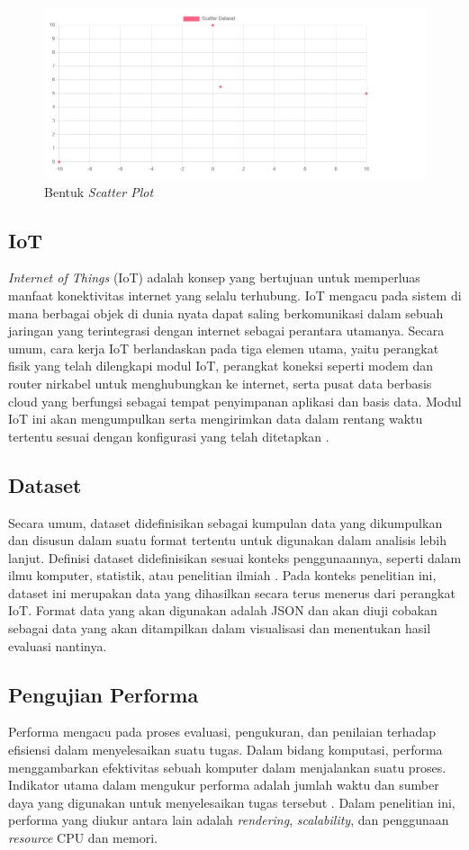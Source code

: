 \begin{figure}[H]
	\centering
	\includegraphics[width=0.8\linewidth]{gambar/Dasar teori/scatter.png}
	\caption{Bentuk \textit{Scatter Plot}}
	\label{gambar1}
\end{figure}

\subsection{IoT}
\textit{Internet of Things} (IoT) adalah konsep yang bertujuan untuk memperluas manfaat konektivitas internet yang selalu terhubung. IoT mengacu pada sistem di mana berbagai objek di dunia nyata dapat saling berkomunikasi dalam sebuah jaringan yang terintegrasi dengan internet sebagai perantara utamanya. Secara umum, cara kerja IoT berlandaskan pada tiga elemen utama, yaitu perangkat fisik yang telah dilengkapi modul IoT, perangkat koneksi seperti modem dan router nirkabel untuk menghubungkan ke internet, serta pusat data berbasis cloud yang berfungsi sebagai tempat penyimpanan aplikasi dan basis data. Modul IoT ini akan mengumpulkan serta mengirimkan data dalam rentang waktu tertentu sesuai dengan konfigurasi yang telah ditetapkan \cite{Mykhailo2024}.

\subsection{Dataset}
Secara umum, dataset didefinisikan sebagai kumpulan data yang dikumpulkan dan disusun dalam suatu format tertentu untuk digunakan dalam analisis lebih lanjut. Definisi dataset didefinisikan sesuai konteks penggunaannya, seperti dalam ilmu komputer, statistik, atau penelitian ilmiah \cite{Renear2010}. Pada konteks penelitian ini, dataset ini merupakan data yang dihasilkan secara terus menerus dari perangkat IoT. Format data yang akan digunakan adalah JSON dan akan diuji cobakan sebagai data yang akan ditampilkan dalam visualisasi dan menentukan hasil evaluasi nantinya. 

\subsection{Pengujian Performa}
Performa mengacu pada proses evaluasi, pengukuran, dan penilaian terhadap efisiensi dalam menyelesaikan suatu tugas. Dalam bidang komputasi, performa menggambarkan efektivitas sebuah komputer dalam menjalankan suatu proses. Indikator utama dalam mengukur performa adalah jumlah waktu dan sumber daya yang digunakan untuk menyelesaikan tugas tersebut \cite{EggerLampl2012}. Dalam penelitian ini, performa yang diukur antara lain adalah \textit{rendering}, \textit{scalability}, dan penggunaan \textit{resource} CPU dan memori. 


